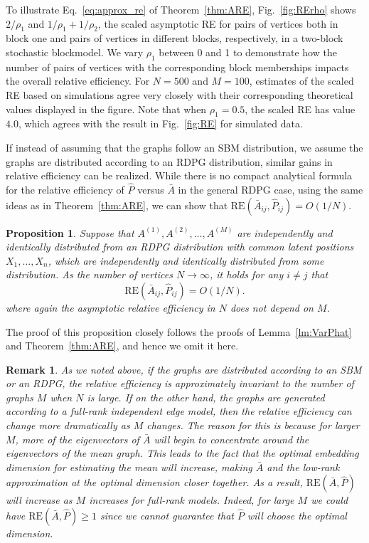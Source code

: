 \documentclass[10pt,letterpaper]{article}
\newtheorem{proposition}[fact]{Proposition}
\newtheorem{remark}[fact]{Remark}
\renewcommand{\hat}{\widehat}
\begin{document}
To illustrate Eq.~\ref{eq:approx_re} of Theorem~\ref{thm:ARE}, Fig.~\ref{fig:RErho} shows $2/\rho_1$ and $1/\rho_1+1/\rho_2$, the scaled asymptotic RE for pairs of vertices both in block one and pairs of vertices in different blocks, respectively, in a  two-block stochastic blockmodel.
We vary $\rho_1$ between 0 and 1 to demonstrate how the number of pairs of vertices with the corresponding block memberships impacts the overall relative efficiency.
For $N=500$ and $M=100$, estimates of the scaled RE based on simulations agree very closely with their corresponding theoretical values displayed in the figure. Note that when $\rho_1 = 0.5$, the scaled RE has value $4.0$, which agrees with the result in Fig.~\ref{fig:RE} for simulated data.



If instead of assuming that the graphs follow an SBM distribution, we assume the graphs are distributed according to an RDPG distribution, similar gains in relative efficiency can be realized.
While there is no compact analytical formula for the relative efficiency of $\hat{P}$ versus $\bar{A}$ in the general RDPG case, using the same ideas as in Theorem~\ref{thm:ARE}, we can show that $\mathrm{RE}(\bar{A}_{ij},\hat{P}_{ij}) = O(1/N)$.

\begin{proposition}
Suppose that $A^{(1)},A^{(2)},\dotsc,A^{(M)}$ are independently and identically distributed from an RDPG distribution with common latent positions $X_1,\dotsc,X_n$, which are independently and identically distributed from some distribution.
As the number of vertices $N\to\infty$, it holds for any $i\neq j$ that 
\[
    \mathrm{RE}(\bar{A}_{ij},\hat{P}_{ij}) = O(1/N).
\]
where again the asymptotic relative efficiency in $N$ does not depend on $M$.
\end{proposition}
The proof of this proposition closely follows the proofs of Lemma~\ref{lm:VarPhat} and Theorem~\ref{thm:ARE}, and hence we omit it here.

\begin{remark}
As we noted above, if the graphs are distributed according to an SBM or an RDPG, the relative efficiency is approximately invariant to the number of graphs $M$ when $N$ is large.
If on the other hand, the graphs are generated according to a full-rank independent edge model, then the relative efficiency can change more dramatically as $M$ changes. 
The reason for this is because for larger $M$, more of the eigenvectors of $\bar{A}$ will begin to concentrate around the eigenvectors of the mean graph.
This leads to the fact that the optimal embedding dimension for estimating the mean will increase, making $\bar{A}$ and the low-rank approximation at the optimal dimension closer together. 
As a result, $\mathrm{RE}(\bar{A},\hat{P})$ will increase as $M$ increases for full-rank models.
Indeed, for large $M$ we could have $\mathrm{RE}(\bar{A},\hat{P})\geq 1$ since we cannot guarantee that $\hat{P}$ will choose the optimal dimension.
\end{remark}
\end{document}
